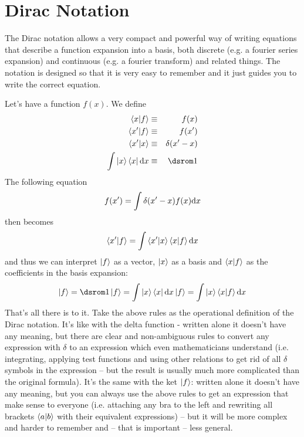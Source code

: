 \section{Dirac Notation}

The Dirac notation allows a very compact and powerful way of writing equations that describe a function expansion into a basis, both discrete (e.g. a fourier series expansion) and continuous (e.g. a fourier transform) and related things. The notation is designed so that it is very easy to remember and it just guides you to write the correct equation.

Let's have a function $f(x)$. We define 
\begin{eqnarray*}
\braket{x|f}&\equiv& f(x) \\
\braket{x'|f}&\equiv& f(x') \\
\braket{x'|x}&\equiv&\delta(x'-x) \\
\int\ket{x}\bra{x}\d x&\equiv&\one \\
\end{eqnarray*}
 The following equation 
\begin{equation*}
  f(x')=\int\delta(x'-x)f(x){\rm d} x
\end{equation*}
then becomes 
\begin{equation*}
  \mathinner{\langle{x'|f}\rangle}=\int\mathinner{\langle{x'|x}\rangle}\mathinner{\langle{x|f}\rangle}{\rm d} x
\end{equation*}
and thus we can interpret $\mathinner{|{f}\rangle}$ as a vector, $\mathinner{|{x}\rangle}$ as a basis and $\mathinner{\langle{x|f}\rangle}$ as the coefficients in the basis expansion: 
\begin{equation*}
  \ket{f}=\one\ket{f}=\int\ket{x}\bra{x}\d x\ket{f}= \int\ket{x}\braket{x|f}\d x
\end{equation*}
That's all there is to it. Take the above rules as the operational definition of the Dirac notation. It's like with the delta function - written alone it doesn't have any meaning, but there are clear and non-ambiguous rules to convert any expression with $\delta$ to an expression which even mathematicians understand (i.e. integrating, applying test functions and using other relations to get rid of all $\delta$ symbols in the expression -- but the result is usually much more complicated than the original formula). It's the same with the ket $\mathinner{|{f}\rangle}$: written alone it doesn't have any meaning, but you can always use the above rules to get an expression that make sense to everyone (i.e. attaching any bra to the left and rewriting all brackets $\mathinner{\langle{a|b}\rangle}$ with their equivalent expressions) -- but it will be more complex and harder to remember and -- that is important -- less general.

